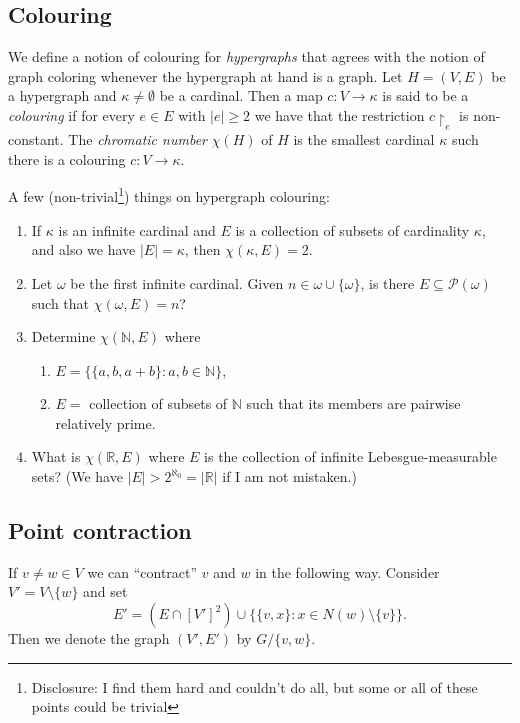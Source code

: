 \documentclass[12pt, a4paper]{amsart}
\begin{document}
\subsection{Colouring} We define a notion of colouring for {\em 
hypergraphs} that agrees with the notion of graph coloring whenever
the hypergraph at hand is a graph. Let $H=(V,E)$ be a hypergraph and 
$\kappa\neq \emptyset$ 
be a cardinal.
Then a map $c:V\to \kappa$ is said to be a {\em colouring} if for
every $e\in E$ with $|e|\geq 2$ we have that
the restriction $c\restriction_e$ is non-constant. The {\em chromatic
number} $\chi(H)$ of $H$ is the smallest cardinal $\kappa$ such there
is a colouring $c:V\to \kappa$.

A few (non-trivial\footnote{Disclosure: I find them hard and couldn't
do all, but some or all of these points could be trivial}) 
things on hypergraph colouring:
\begin{enumerate}
\item If $\kappa$ is an infinite cardinal and $E$ is a collection 
of subsets of cardinality $\kappa$, and also we have $|E| = \kappa$,
then $\chi(\kappa, E) = 2$. 
\item Let $\omega$ be the first infinite cardinal. Given $n\in 
\omega\cup\{\omega\}$, is there $E\subseteq {\mathcal P}(\omega)$
such that $\chi(\omega, E) = n$?
\item Determine $\chi(\mathbb{N}, E)$ where 
\begin{enumerate}
\item $E = \big\{\{a,b,a+b\}: a, b\in \mathbb{N}\big\}$,
\item $E = $ collection of subsets of $\mathbb{N}$ such 
that its members are pairwise relatively prime.
\end{enumerate}
\item What is $\chi(\mathbb{R}, E)$ where $E$ is the collection
	of infinite Lebesgue-measurable sets? (We have $|E| >
		2^{\aleph_0} = |\mathbb{R}|$ if I am not mistaken.)
\end{enumerate}
\subsection{Point contraction} If $v\neq w\in V$ we can ``contract'' 
$v$ and $w$ in the following way. Consider $V' = V\setminus \{w\}$
and set $$E' = (E \cap [V']^2) \cup \big\{\{v,x\}: x\in N(w)
\setminus\{v\}\big\}.$$
Then we denote the graph $(V', E')$ by $G/\{v,w\}$.
\end{document}

